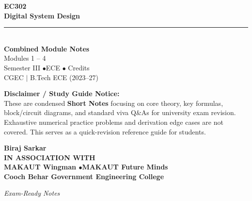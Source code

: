 \documentclass[12pt,a4paper]{article}
\begin{document}
\thispagestyle{empty}


\vspace*{1.0cm}
\begin{center}
  {\Huge\bfseries\color{myred} EC302}\\[10pt]
  {\LARGE\bfseries\color{mydark} Digital System Design}\\[20pt]
  {\color{myred}\rule{0.7\linewidth}{1.5pt}}\\[18pt]
  {\Large\color{myteal}\textbf{Combined Module Notes}}\\[8pt]
  {\large\color{mydark} Modules 1 -- 4}\\[40pt]
  {\normalsize\color{mydark} Semester III \quad$\bullet$\quad ECE \quad$\bullet$ Credits}\\[12pt]
  {\normalsize\color{mydark} CGEC \;$|$\; B.Tech ECE (2023--27)}
\end{center}
\vspace{1.0cm}
\begin{center}
  \begin{tcolorbox}[colback=mygray, colframe=mgframe, boxrule=0.5pt, arc=3pt, width=0.85\linewidth]
    \centering\small\color{mydark}
    \textbf{Disclaimer / Study Guide Notice:}\\
    These are condensed \textbf{Short Notes} focusing on core theory, key formulas, block/circuit diagrams, and standard viva Q\&As for university exam revision. Exhaustive numerical practice problems and derivation edge cases are not covered. This serves as a quick-revision reference guide for students.
  \end{tcolorbox}
\end{center}
\vfill
\vspace{0.6cm}
\begin{center}
  {\large\bfseries\color{mypurple} Biraj Sarkar}\\[16pt]
  {\footnotesize\color{watermark}\textbf{IN ASSOCIATION WITH}}\\[8pt]
  {\small\bfseries\color{mydark} MAKAUT Wingman \quad$\bullet$\quad MAKAUT Future Minds}\\[12pt]
  {\large\bfseries\color{myteal} Cooch Behar Government Engineering College}
\end{center}
\vfill
\begin{center}{\small\color{watermark}\textit{Exam-Ready Notes}}\end{center}
\clearpage
\end{document}
